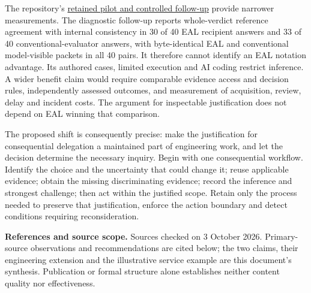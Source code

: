 \documentclass[11pt,a4paper]{article}
\begin{document}
The repository's \href{https://github.com/emmett08/earl/blob/main/paper/README.md}{retained pilot and controlled follow-up} provide narrower measurements. The diagnostic follow-up reports whole-verdict reference agreement with internal consistency in 30 of 40 EAL recipient answers and 33 of 40 conventional-evaluator answers, with byte-identical EAL and conventional model-visible packets in all 40 pairs. It therefore cannot identify an EAL notation advantage. Its authored cases, limited execution and AI coding restrict inference. A wider benefit claim would require comparable evidence access and decision rules, independently assessed outcomes, and measurement of acquisition, review, delay and incident costs. The argument for inspectable justification does not depend on EAL winning that comparison.

The proposed shift is consequently precise: make the justification for consequential delegation a maintained part of engineering work, and let the decision determine the necessary inquiry. Begin with one consequential workflow. Identify the choice and the uncertainty that could change it; reuse applicable evidence; obtain the missing discriminating evidence; record the inference and strongest challenge; then act within the justified scope. Retain only the process needed to preserve that justification, enforce the action boundary and detect conditions requiring reconsideration.

\textbf{References and source scope.} Sources checked on 3 October 2026. Primary-source observations and recommendations are cited below; the two claims, their engineering extension and the illustrative service example are this document's synthesis. Publication or formal structure alone establishes neither content quality nor effectiveness.
\end{document}
